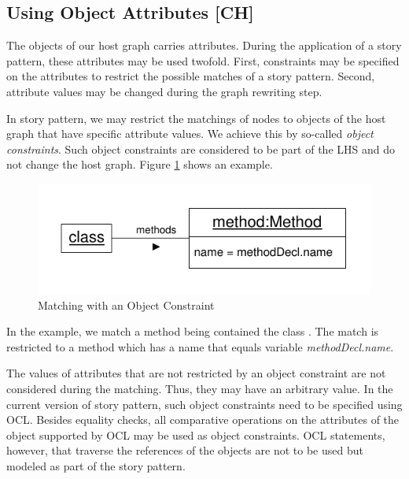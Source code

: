 
\subsection{Using Object Attributes [CH]}

The objects of our host graph carries attributes. During the application of a story pattern, these attributes may be used twofold. First, constraints may be specified on the attributes to restrict the possible matches of a story pattern. Second, attribute values may be changed during the graph rewriting step.

In story pattern, we may restrict the matchings of nodes to objects of the host graph that have specific attribute values. We achieve this by so-called \emph{object constraints}. Such object constraints are considered to be part of the LHS and do not change the host graph. Figure \ref{fig:objectConstraint} shows an example.

\begin{figure}[htbp]
  \centering
  \includegraphics[scale=1]{figures/ObjectConstraint}
  \caption{Matching with an Object Constraint}
  \label{fig:objectConstraint}
\end{figure}

In the example, we match a method being contained the class . The match is restricted to a method which has a name that equals variable \emph{methodDecl.name}.

The values of attributes that are not restricted by an object constraint are not considered during the matching. Thus, they may have an arbitrary value. In the current version of story pattern, such object constraints need to be specified using OCL. Besides equality checks, all comparative operations on the attributes of the object supported by OCL may be used as object constraints. OCL statements, however, that traverse the references of the objects are not to be used but modeled as part of the story pattern.

